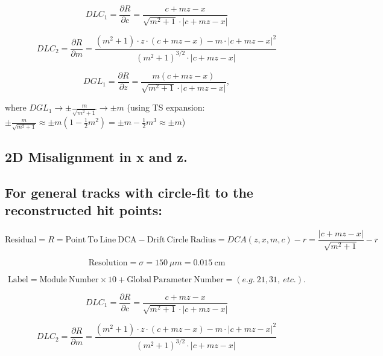\documentclass[a4paper,11pt]{article}
\begin{document}
\begin{equation}
DLC_1 = \frac{\partial R}{\partial c} = \frac{ c+mz-x }  { \sqrt{m^2+1} \cdot |c+mz-x| }
\end{equation}

\begin{equation}
DLC_2 = \frac{ \partial R}{\partial m} = \frac{ (m^2+1)\cdot z\cdot(c+mz-x) - m\cdot |c+mz-x|^2 }{ (m^2+1)^{3/2} \cdot |c+mz-x|  }
\end{equation}

\begin{equation}	
DGL_1 = \frac{\partial R}{\partial z} = \frac{ m(c+mz-x) }  { \sqrt{m^2+1} \cdot |c+mz-x| },
\end{equation}

 where $DGL_1 \rightarrow \pm \frac{m}{\sqrt{m^2+1}} \rightarrow \pm m$
(using TS expansion: $\pm \frac{m}{\sqrt{m^2+1}} \approx \pm m (1-\frac{1}{2}m^2) = \pm m - \frac{1}{2}m^3 \approx \pm m  $)

\clearpage
\subsection{2D Misalignment in x and z.}
\subsection{For general tracks with circle-fit to the reconstructed hit points:}
\begin{equation}	
\mathrm{Residual}= R =\mathrm{Point \ To \ Line \ DCA} - \mathrm{Drift \ Circle \ Radius} = DCA(z,x,m,c) - r = \frac{ |c+mz-x| }  { \sqrt{m^2+1} } -r
\end{equation}

\begin{equation}	
\mathrm{Resolution} = \sigma = 150 \ \mu m = 0.015 \ \mathrm{cm}
\end{equation}

\begin{equation}	
\mathrm{Label}= \mathrm{Module \ Number} \times 10 + \mathrm{Global \ Parameter \ Number} = (e.g. \ 21, 31, \ etc.).
\end{equation}

\begin{equation}
DLC_1 = \frac{\partial R}{\partial c} = \frac{ c+mz-x }  { \sqrt{m^2+1} \cdot |c+mz-x| }
\end{equation}

\begin{equation}
DLC_2 = \frac{ \partial R}{\partial m} = \frac{ (m^2+1)\cdot z\cdot(c+mz-x) - m\cdot |c+mz-x|^2 }{ (m^2+1)^{3/2} \cdot |c+mz-x|  }
\end{equation}
\end{document}
